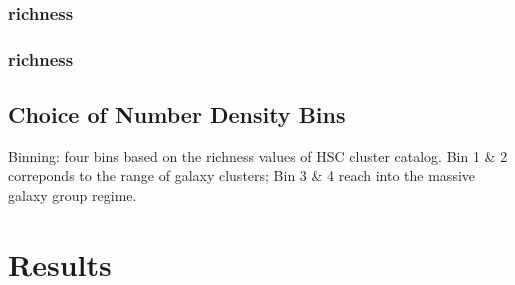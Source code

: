 \documentclass[a4paper,fleqn,usenatbib]{mnras}
\begin{document}

\subsubsection{\redm{} richness}
    \label{sec:redmapper}


\subsubsection{\camira{} richness}
    \label{sec:camira}


\subsection{Choice of Number Density Bins}
    \label{sec:binning}


    Binning: four bins based on the richness values of HSC \redm{} cluster catalog. Bin 1 \& 2
    correponds to the \mvir{} range of galaxy clusters; Bin 3 \& 4 reach into the massive galaxy
    group regime.
            


\section{Results}
    \label{sec:result}
\end{document}

